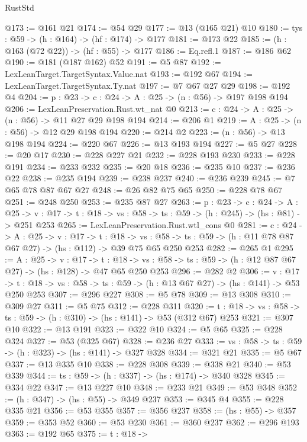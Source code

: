 \begin{lexlean}{RustStd}
\begin{coremodule}
@173 := @161 @21
@174 := @54 @29
@177 := @13 (@165 @21) @10
@180 := {tys : @59} -> (h : @164) -> (hf : @174) -> @177
@181 := @173 @22
@185 := (h : @163 (@72 @22)) -> (hf : @55) -> @177
@186 := Eq.refl.{1}
@187 := @186 @62
@190 := @181 (@187 @162) @52
@191 := @5 @87
@192 := LexLeanTarget.TargetSyntax.Value.nat
@193 := @192 @67
@194 := LexLeanTarget.TargetSyntax.Ty.nat
@197 := @7 @67 @27 @29
@198 := @192 @4
@204 := {p : @23} -> {c : @24} -> {A : @25} -> (n : @56) -> @197 @198 @194
@206 := LexLeanPreservation.Rust.wt_nat @0
@213 := {c : @24} -> {A : @25} -> (n : @56) -> @11 @27 @29 @198 @194
@214 := @206 @1
@219 := {A : @25} -> (n : @56) -> @12 @29 @198 @194
@220 := @214 @2
@223 := (n : @56) -> @13 @198 @194
@224 := @220 @67
@226 := @13 @193 @194
@227 := @5 @27
@228 := @20 @17
@230 := @228 @227 @21
@232 := @228 @193 @230
@233 := @228 @191
@234 := @233 @232
@235 := @20 @18
@236 := @235 @10
@237 := @236 @22
@238 := @235 @194
@239 := @238 @237
@240 := @236 @239
@245 := @7 @65 @78 @87 @67 @27
@248 := @26 @82 @75 @65
@250 := @228 @78 @67
@251 := @248 @250
@253 := @235 @87 @27
@263 := {p : @23} ->
  {c : @24} ->
  {A : @25} ->
  {v : @17} -> {t : @18} -> {vs : @58} -> {ts : @59} -> (h : @245) -> (hs : @81) -> @251 @253
@265 := LexLeanPreservation.Rust.wtl_cons @0
@281 := {c : @24} ->
  {A : @25} ->
  {v : @17} ->
  {t : @18} ->
  {vs : @58} -> {ts : @59} -> (h : @11 @78 @87 @67 @27) -> (hs : @112) -> @39 @75 @65 @250 @253
@282 := @265 @1
@295 := {A : @25} ->
  {v : @17} ->
  {t : @18} -> {vs : @58} -> {ts : @59} -> (h : @12 @87 @67 @27) -> (hs : @128) -> @47 @65 @250 @253
@296 := @282 @2
@306 := {v : @17} ->
  {t : @18} -> {vs : @58} -> {ts : @59} -> (h : @13 @67 @27) -> (hs : @141) -> @53 @250 @253
@307 := @296 @227
@308 := @5 @78
@309 := @13 @308
@310 := @309 @27
@311 := @5 @75
@312 := @228 @311
@320 := {t : @18} -> {vs : @58} -> {ts : @59} -> (h : @310) -> (hs : @141) -> @53 (@312 @67) @253
@321 := @307 @10
@322 := @13 @191
@323 := @322 @10
@324 := @5 @65
@325 := @228 @324
@327 := @53 (@325 @67)
@328 := @236 @27
@333 := {vs : @58} -> {ts : @59} -> (h : @323) -> (hs : @141) -> @327 @328
@334 := @321 @21
@335 := @5 @67
@337 := @13 @335 @10
@338 := @228 @308
@339 := @338 @21
@340 := @53 @339
@344 := {ts : @59} -> (h : @337) -> (hs : @174) -> @340 @328
@345 := @334 @22
@347 := @13 @227 @10
@348 := @233 @21
@349 := @53 @348
@352 := (h : @347) -> (hs : @55) -> @349 @237
@353 := @345 @4
@355 := @228 @335 @21
@356 := @53 @355
@357 := @356 @237
@358 := (hs : @55) -> @357
@359 := @353 @52
@360 := @53 @230
@361 := @360 @237
@362 := @296 @193
@363 := @192 @65
@375 := {t : @18} ->

\end{coremodule}
\end{lexlean}
